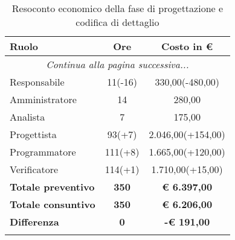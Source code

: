 \documentclass[../piano_di_progetto.tex]{subfiles}
\begin{document}
\begin{center}
	\begin{longtable}{|l|c|c|}
		\hline
		\rowcolor{lightgray}
		\textbf{Ruolo} & \textbf{Ore} & \textbf{Costo in €}\\
		\hline
		\endhead
		
		\hline
		\multicolumn{3}{|c|}{\emph{Continua alla pagina successiva...}}\\
		\hline
		\endfoot

		\endlastfoot
		Responsabile & 	 11(-16) 	 & 330,00(-480,00) \\
		Amministratore & 14 	 & 280,00 \\
		Analista & 		7 	 & 175,00 \\
		Progettista &    93(+7)   & 2.046,00(+154,00) \\
		Programmatore &  111(+8)   & 1.665,00(+120,00) \\
		Verificatore &   114(+1)  & 1.710,00(+15,00) \\
		\hline
		\textbf{Totale preventivo} & \textbf{350} & \textbf{€ 6.397,00} \\
		\hline
		\textbf{Totale consuntivo} & \textbf{350} & \textbf{€ 6.206,00} \\
		\hline
		\textbf{Differenza} & \textbf{0} & \textbf{-€ 191,00}\\
		\hline
		\rowcolor{white}
		\caption{Resoconto economico della fase di progettazione e codifica di dettaglio}
	\end{longtable}
\end{center}
\end{document}
